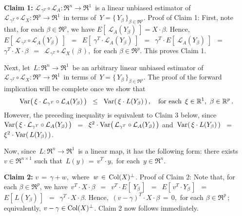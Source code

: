 \vskip 0.5cm
\noindent
\textbf{Claim 1:}\quad
$\mathcal{L}_{\,\gamma^{T}} \circ \mathcal{L}_{A} : \Re^{n} \longrightarrow \Re^{1}$\,
is a linear unbiased estimator of
\,$\mathcal{L}_{\,\gamma^{T}} \circ \mathcal{L}_{X} : \Re^{p} \longrightarrow \Re^{1}$\,
in terms of \,$Y = \{\,Y_{\beta}\,\}_{\beta\in\Re^{p}}$.
\vskip 0.1cm
\noindent
Proof of Claim 1:\quad
First, note that, for each $\beta\in\Re^{p}$, we have $E\!\left[\; \mathcal{L}_{A}(Y_{\beta})\;\right] = X \cdot \beta$.
Hence,
$E\!\left[\;\mathcal{L}_{\,\gamma^{T}} \circ \mathcal{L}_{A}(Y_{\beta})\;\right]$
\,$=$\, $E\!\left[\;\gamma^{T} \cdot \mathcal{L}_{A}(Y_{\beta})\;\right]$
\,$=$\, $\gamma^{T} \cdot E\!\left[\; \mathcal{L}_{A}(Y_{\beta})\;\right]$
\,$=$\, $\gamma^{T} \cdot X \cdot \beta$
\,$=$\, $\mathcal{L}_{\,\gamma^{T}} \circ \mathcal{L}_{X}(\,\beta\,)$,\,
for each $\beta\in\Re^{p}$.
This proves Claim 1.

\vskip 0.5cm
\noindent
Next, let
\,$L : \Re^{n} \longrightarrow \Re^{1}$\,
be an arbitrary linear unbiased estimator of
\,$\mathcal{L}_{\,\gamma^{T}} \circ \mathcal{L}_{X} : \Re^{p} \longrightarrow \Re^{1}$\,
in terms of \,$Y = \{\,Y_{\beta}\,\}_{\beta\in\Re^{p}}$.
The proof of the forward implication will be complete once we show that
\begin{equation*}
\textnormal{Var}\!\left(\,\xi\cdot\mathcal{L}_{\gamma^{T}}\circ\mathcal{L}_{A}(Y_{\beta})\,\right)
\;\; \leq \;\;
	\textnormal{Var}\!\left(\,\xi \cdot L(Y_{\beta})\,\right),
\quad
\textnormal{for each \,$\xi \in \mathbb{R}^{1}$, \,$\beta\in\mathbb{R}^{p}$}\,.
\end{equation*}
However, the preceding inequality is equivalent to Claim 3 below, since
\,$\textnormal{Var}\!\left(\,\xi\cdot\mathcal{L}_{\gamma^{T}}\circ\mathcal{L}_{A}(Y_{\beta})\,\right)$
\,$=$\, $\xi^{2}\cdot\textnormal{Var}\!\left(\,\mathcal{L}_{\gamma^{T}}\circ\mathcal{L}_{A}(Y_{\beta})\,\right)$
and
\,$\textnormal{Var}\!\left(\,\xi \cdot L(Y_{\beta})\,\right)$
\,$=$\, $\xi^{2} \cdot \textnormal{Var}\!\left(\,L(Y_{\beta})\,\right)$.

\vskip 0.5cm
\noindent
Now, since \,$L : \Re^{n} \longrightarrow \Re^{1}$\,
is a linear map, it has the following form:
there exists $v \in \Re^{n \times 1}$ such that
\,$L(y) \,=\, v^{T} \cdot y$,\,
for each \,$y \in \Re^{n}$.

\vskip 0.5cm
\noindent
\textbf{Claim 2:}\quad
$v \,=\, \gamma + w$,\, where \,$w \,\in\, \textnormal{Col}(X)^{\perp}$.
\vskip 0.1cm
\noindent
Proof of Claim 2:\quad
Note that, for each $\beta \in \Re^{p}$, we have
\,$v^{T}\cdot X \cdot \beta$
\,$=$\, $v^{T} \cdot E\!\left[\;Y_{\beta}\,\right]$
\,$=$\, $E\!\left[\,v^{T} \cdot Y_{\beta}\,\right]$
\,$=$\, $E\!\left[\,L(Y_{\beta})\,\right]$
\,$=$\, $\gamma^{T} \cdot X \cdot \beta$.
Hence,
\,$(v - \gamma)^{T} \cdot X \cdot \beta \,=\, 0$,\,
for each $\beta\in\Re^{p}$\,;
equivalently, $v - \gamma \in \textnormal{Col}(X)^{\perp}$.
Claim 2 now follows immediately.

